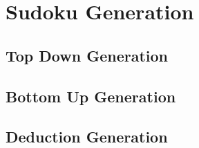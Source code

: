 
\section{Sudoku Generation}

    \subsection{Top Down Generation}

    \subsection{Bottom Up Generation}

    \subsection{Deduction Generation}

